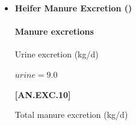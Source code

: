\begin{refsection}
\begin{itemize}
            {\raggedleft \textbf{[AN.EXC.7]}\par}
            \vspace{0.5cm} 
            
Urine N excretion (kg/d)
        \vspace{0.5cm}
    
    \begin{center}
        \(urine\_nitrogen = 0.45 * manure\_nitrogen\)
    \end{center}
        \vspace{0.5cm} 
    
            {\raggedleft \textbf{[AN.EXC.8]}\par}
            \vspace{0.5cm} 

Manure total ammoniacal nitrogen (kg/d) 
        \vspace{0.5cm}
    
    \begin{center}
        \(manure\_total\_ammoniacal\_nitrogen = urine\_nitrogen\)
    \end{center}
        \vspace{0.5cm} 
    
            {\raggedleft \textbf{[AN.EXC.9]}\par}
            \vspace{0.5cm} 

\item \textbf{Heifer Manure Excretion ()}
\vspace{0.2cm}

\paragraph{Manure excretions}
\vspace{-0.25cm}
        
Urine excretion (kg/d)
        \vspace{0.5cm}
    
    \begin{center}
        \(urine=9.0\)
    \end{center}
        \vspace{0.5cm} 
    
            {\raggedleft \textbf{[AN.EXC.10]}\par}
            \vspace{0.5cm} 

Total manure excretion (kg/d)
        \vspace{0.5cm}
    

\end{itemize}
\end{refsection}

